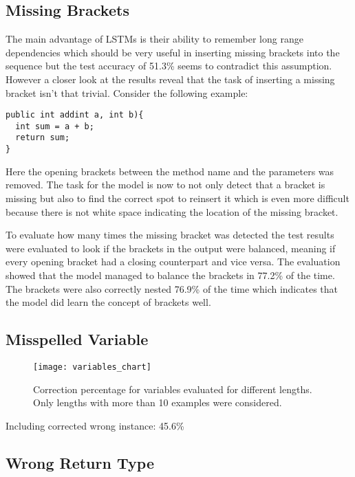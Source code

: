 \subsection{Missing Brackets}

The main advantage of LSTMs is their ability to remember long range dependencies which should be very useful in inserting missing brackets into the sequence but the test accuracy of 51.3\% seems to contradict this assumption. However a closer look at the results reveal that the task of inserting a missing bracket isn't that trivial. Consider the following example:

\begin{lstlisting}[style=inline]
public int addint a, int b){
  int sum = a + b;
  return sum;
}
\end{lstlisting}

Here the opening brackets between the method name and the parameters was removed. The task for the model is now to not only detect that a bracket is missing but also to find the correct spot to reinsert it which is even more difficult because there is not white space indicating the location of the missing bracket.

To evaluate how many times the missing bracket was detected the test results were evaluated to look if the brackets in the output were balanced, meaning if every opening bracket had a closing counterpart and vice versa. The evaluation showed that the model managed to balance the brackets in 77.2\% of the time. The brackets were also correctly nested 76.9\% of the time which indicates that the model did learn the concept of brackets well.

\subsection{Misspelled Variable}

\begin{figure}[t]
\centering
\texttt{[image: variables\_chart]}
\caption{Correction percentage for variables evaluated for different lengths. Only lengths with more than 10 examples were considered.}
\label{variables_chart}
\end{figure}

Including corrected wrong instance: 45.6\%

\subsection{Wrong Return Type}

